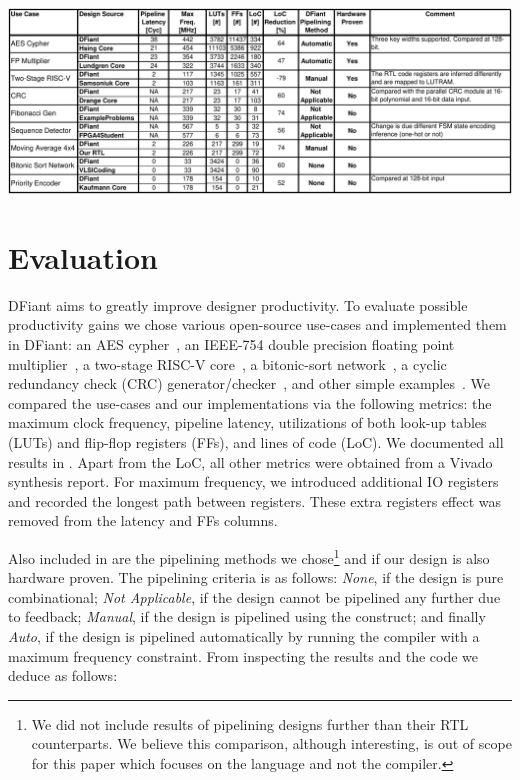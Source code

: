 
\begin{table}[t]
	\centering
	\captionsetup{justification=centering}
	\label{tbl:Results}
	\includegraphics[width=0.8\linewidth]{graphics/Results.pdf}
\end{table}

\section{Evaluation}
\label{sec:evaluation}
DFiant aims to greatly improve designer productivity. To evaluate possible productivity gains we chose various open-source use-cases and implemented them in DFiant: an AES cypher~\cite{hsing2013aes}, an IEEE-754 double precision floating point multiplier~\cite{lundgren2014open}, a two-stage RISC-V core~\cite{samsoniuk2019riscv}, a bitonic-sort network~\cite{bitsortvhdl}, a cyclic redundancy check (CRC) generator/checker~\cite{drange2016crc}, and other simple examples~\cite{pedroni2008digital, fibgenvhdl, seqdetvhdl}. We compared the use-cases and our implementations via the following metrics: the maximum clock frequency, pipeline latency, utilizations of both look-up tables (LUTs) and flip-flop registers (FFs), and lines of code (LoC). We documented all results in . Apart from the LoC, all other metrics were obtained from a Vivado synthesis report. For maximum frequency, we introduced additional IO registers and recorded the longest path between registers. These extra registers effect was removed from the latency and FFs columns.  

Also included in  are the pipelining methods we chose\footnote{We did not include results of pipelining designs further than their RTL counterparts. We believe this comparison, although interesting, is out of scope for this paper which focuses on the language and not the compiler.} and if our design is also hardware proven. The pipelining criteria is as follows: \emph{None}, if the design is pure combinational; \emph{Not Applicable}, if the design cannot be pipelined any further due to feedback; \emph{Manual}, if the design is pipelined using the  construct; and finally \emph{Auto}, if the design is pipelined automatically by running the compiler with a maximum frequency constraint. From inspecting the results and the code we deduce as follows:


